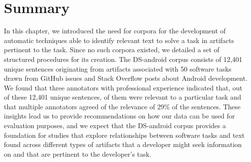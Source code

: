 
\section{Summary}
\label{cp4:corpus-summary}

In this chapter, we introduced the need for corpora 
for the development of 
automatic techniques able to identify relevant text
to solve a task in artifacts
pertinent to the task.
Since  no such corpora
existed, we detailed 
a set of structured procedures for its creation. 
The \acs{DS-android} corpus consists of  
12,401 unique sentences
originating from artifacts associated with 50 software tasks
drawn from GitHub issues and Stack Overflow posts about Android development. 
We found that 
three annotators with professional experience indicated that,
out of these 12,401 unique sentences, 
 of them were relevant to a particular task and that multiple annotators agreed of the relevance of 29\% of the sentences.
These insights lead us to provide recommendations on how our data can be used for evaluation purposes, and we expect that the \acs{DS-android} corpus
provides a foundation for studies that explore relationships between software tasks and text found across different types of artifacts that a developer might seek information on and that are pertinent to the developer's task.
 
